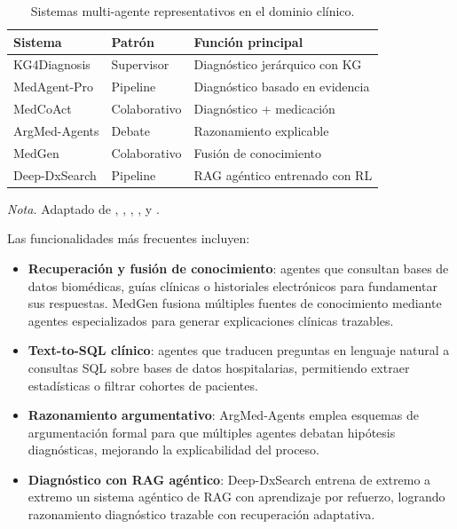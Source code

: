 \begin{table}[ht]
\centering
\caption{Sistemas multi-agente representativos en el dominio clínico.}
\label{tab:agentes_clinicos}
\small
\begin{tabularx}{\columnwidth}{llX}
\toprule
\textbf{Sistema} & \textbf{Patrón} & \textbf{Función principal} \\
\midrule
KG4Diagnosis & Supervisor & Diagnóstico jerárquico con KG \\
MedAgent-Pro & Pipeline & Diagnóstico basado en evidencia \\
MedCoAct & Colaborativo & Diagnóstico + medicación \\
ArgMed-Agents & Debate & Razonamiento explicable \\
MedGen & Colaborativo & Fusión de conocimiento \\
Deep-DxSearch & Pipeline & \ac{RAG} agéntico entrenado con RL \\
\bottomrule
\end{tabularx}
\vspace{0.5em}
{\footnotesize\raggedright\textit{Nota.} Adaptado de \textcite{Zuo2025KG4Diagnosis}, \textcite{Wang2025MedAgentPro}, \textcite{Zheng2025MedCoAct}, \textcite{Hong2024ArgMed}, \textcite{Liu2024MedGen} y \textcite{Zheng2025DeepDxSearch}.\par}
\end{table}

Las funcionalidades más frecuentes incluyen:

\begin{itemize}[nosep, leftmargin=*]
    \item \textbf{Recuperación y fusión de conocimiento}: agentes que consultan bases de datos biomédicas, guías clínicas o historiales electrónicos para fundamentar sus respuestas. MedGen \parencite{Liu2024MedGen} fusiona múltiples fuentes de conocimiento mediante agentes especializados para generar explicaciones clínicas trazables.
    \item \textbf{Text-to-\ac{SQL} clínico}: agentes que traducen preguntas en lenguaje natural a consultas \ac{SQL} sobre bases de datos hospitalarias, permitiendo extraer estadísticas o filtrar cohortes de pacientes.
    \item \textbf{Razonamiento argumentativo}: ArgMed-Agents \parencite{Hong2024ArgMed} emplea esquemas de argumentación formal para que múltiples agentes debatan hipótesis diagnósticas, mejorando la explicabilidad del proceso.
    \item \textbf{Diagnóstico con \ac{RAG} agéntico}: Deep-DxSearch \parencite{Zheng2025DeepDxSearch} entrena de extremo a extremo un sistema agéntico de \ac{RAG} con aprendizaje por refuerzo, logrando razonamiento diagnóstico trazable con recuperación adaptativa.
\end{itemize}

